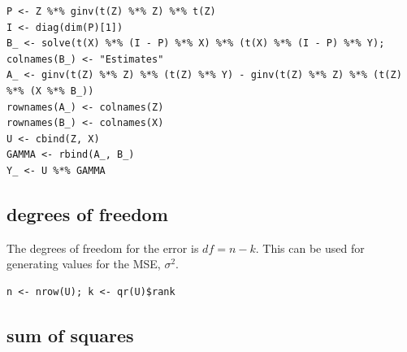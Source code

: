\documentclass[10pt, twoside, openleft]{article}
\begin{document}
\begin{verbatim}
P <- Z %*% ginv(t(Z) %*% Z) %*% t(Z)
I <- diag(dim(P)[1])
B_ <- solve(t(X) %*% (I - P) %*% X) %*% (t(X) %*% (I - P) %*% Y); colnames(B_) <- "Estimates"
A_ <- ginv(t(Z) %*% Z) %*% (t(Z) %*% Y) - ginv(t(Z) %*% Z) %*% (t(Z) %*% (X %*% B_))
rownames(A_) <- colnames(Z)
rownames(B_) <- colnames(X)
U <- cbind(Z, X)
GAMMA <- rbind(A_, B_)
Y_ <- U %*% GAMMA
\end{verbatim}

\begin{center}
\subsection{degrees of freedom}
\vspace{-3ex}
\end{center}

\noindent
The degrees of freedom for the error is $df = n-k$. This can be used for generating
values for the MSE, $\sigma^{2}$.
\bigskip

\begin{verbatim}
n <- nrow(U); k <- qr(U)$rank
\end{verbatim}

\begin{center}
\subsection{sum of squares}
\vspace{-3ex}
\end{center}
\end{document}
